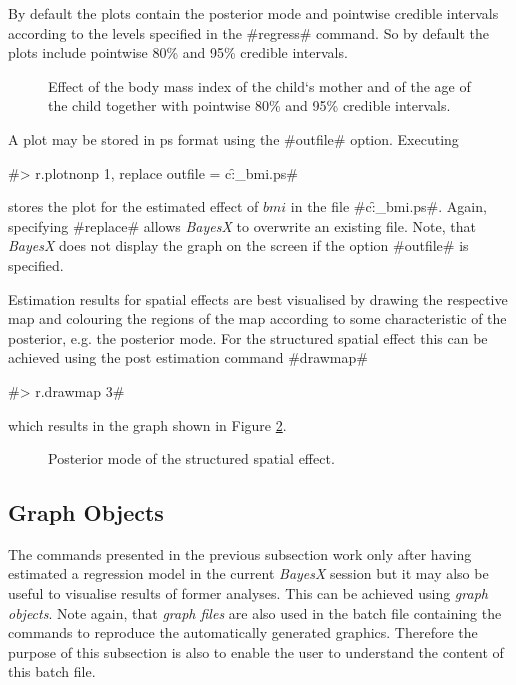 \documentclass{article}
\begin{document}
By default the plots contain the posterior mode and pointwise
credible intervals according to the levels specified in the
#regress# command. So by default the plots include pointwise 80\%
and 95\% credible intervals.

\begin{figure}[ht]
\begin{center}
 {\it\caption{Effect of
the body mass index of the child`s mother and of the age of the
child together with pointwise 80\% and 95\% credible intervals.
\label{bmi1}}}
\end{center}
\end{figure}

A plot may be stored in ps format using the #outfile# option.
Executing

#> r.plotnonp 1, replace outfile = c:\data\f_bmi.ps#

stores the plot for the estimated effect of $bmi$ in the file
#c:\data\f_bmi.ps#. Again, specifying #replace# allows {\it
BayesX} to overwrite an existing file. Note, that {\it BayesX}
does not display the graph on the screen if the option #outfile#
is specified.

Estimation results for spatial effects are best visualised by
drawing the respective map and colouring the regions of the map
according to some characteristic of the posterior, e.g. the
posterior mode. For the structured spatial effect this can be
achieved using the post estimation command #drawmap#

#> r.drawmap 3#

which results in the graph shown in Figure \ref{spat1}.

\begin{figure}[ht]
\begin{center}
{\it\caption{Posterior mode of the structured spatial
effect.\label{spat1}}}
\end{center}
\end{figure}


\subsection{Graph Objects}

The commands presented in the previous subsection work only after
having estimated a regression model in the current {\em BayesX}
session but it may also be useful to visualise results of former
analyses. This can be achieved using {\em graph objects}. Note
again, that {\em graph files} are also used in the batch file
containing the commands to reproduce the automatically generated
graphics. Therefore the purpose of this subsection is also to enable
the user to understand the content of this batch file.
\end{document}
